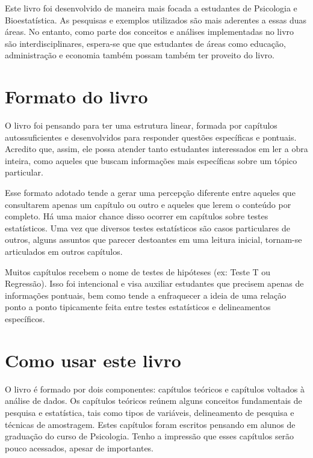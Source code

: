 \documentclass[
]{book}
\begin{document}
Este livro foi desenvolvido de maneira mais focada a estudantes de Psicologia e Bioestatística. As pesquisas e exemplos utilizados são mais aderentes a essas duas áreas. No entanto, como parte dos conceitos e análises implementadas no livro são interdisciplinares, espera-se que que estudantes de áreas como educação, administração e economia também possam também ter proveito do livro.

\hypertarget{formato-do-livro}{%
\section{Formato do livro}\label{formato-do-livro}}

O livro foi pensando para ter uma estrutura linear, formada por capítulos autossuficientes e desenvolvidos para responder questões específicas e pontuais. Acredito que, assim, ele possa atender tanto estudantes interessados em ler a obra inteira, como aqueles que buscam informações mais específicas sobre um tópico particular.

Esse formato adotado tende a gerar uma percepção diferente entre aqueles que consultarem apenas um capítulo ou outro e aqueles que lerem o conteúdo por completo. Há uma maior chance disso ocorrer em capítulos sobre testes estatísticos. Uma vez que diversos testes estatísticos são casos particulares de outros, alguns assuntos que parecer destoantes em uma leitura inicial, tornam-se articulados em outros capítulos.

Muitos capítulos recebem o nome de testes de hipóteses (ex: Teste T ou Regressão). Isso foi intencional e visa auxiliar estudantes que precisem apenas de informações pontuais, bem como tende a enfraquecer a ideia de uma relação ponto a ponto tipicamente feita entre testes estatísticos e delineamentos específicos.

\hypertarget{como-usar-este-livro}{%
\section{Como usar este livro}\label{como-usar-este-livro}}

O livro é formado por dois componentes: capítulos teóricos e capítulos voltados à análise de dados. Os capítulos teóricos reúnem alguns conceitos fundamentais de pesquisa e estatística, tais como tipos de variáveis, delineamento de pesquisa e técnicas de amostragem. Estes capítulos foram escritos pensando em alunos de graduação do curso de Psicologia. Tenho a impressão que esses capítulos serão pouco acessados, apesar de importantes.
\end{document}
